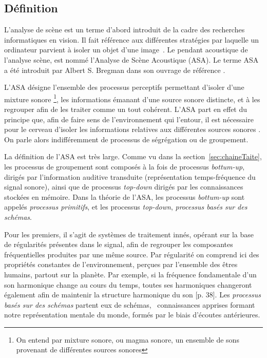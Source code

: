 \subsection{Définition}
\label{sec:ASAintro}

L'analyse de scène est un terme d'abord introduit de la cadre des recherches informatiques en vision. Il fait référence aux différentes stratégies par laquelle un ordinateur parvient à isoler un objet d'une image~\citep[p. 12]{mcadams1994penser}. Le pendant acoustique de l'analyse scène, est nommé l'Analyse de Scène Acoustique (ASA). Le terme ASA a été introduit par Albert S. Bregman dans son ouvrage de référence \citep{bregman1994auditory}.  

L'ASA désigne l'ensemble des processus perceptifs permettant d'isoler d'une mixture sonore \footnote{On entend par mixture sonore, ou magma sonore, un ensemble de sons provenant de différentes sources sonores}, les informations émanant d'une source sonore distincte, et à les regrouper afin de les traiter comme un tout cohérent.  L'ASA part en effet du principe que, afin de faire sens de l'environnement qui l'entour, il est nécessaire pour le cerveau d'isoler les informations relatives aux différentes sources sonores \citep{winkler2009modeling}. On parle alors indifféremment de processus de ségrégation ou de groupement.

La définition de l'ASA est très large. Comme vu dans la section~\ref{sec:chaineTaite}, les processus de groupement sont composés à la fois de processus \emph{bottum-up}, \ie~ dirigés par l'information auditive transduite (représentation temps-fréquence du signal sonore), ainsi que de processus \emph{top-down} dirigés par les connaissances stockées en mémoire. Dans la théorie de l'ASA, les processus \emph{bottum-up} sont appelés \emph{processus primitifs}, et les processus  \emph{top-down}, \emph{processus basés sur des schémas}. 

Pour les premiers, il s'agit de systèmes de traitement innés, opérant sur la base de régularités présentes dans le signal, afin de regrouper les composantes fréquentielles produites par une même source. Par régularité on comprend ici des propriétés constantes de l'environnement, perçues par l'ensemble des êtres humains, partout sur la planète. Par exemple, si la fréquence fondamentale d'un son harmonique change au cours du temps, toutes ses harmoniques changeront également afin de maintenir la structure harmonique du son [p. 38]\citep{bregman1994auditory}. Les \emph{processus basés sur des schémas}  partent eux de schémas, \ie~connaissances apprises formant notre représentation mentale du monde, formés par le biais d'écoutes antérieures. 

